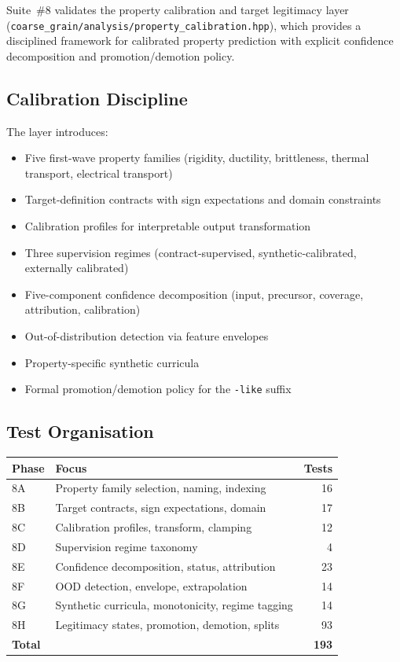 \documentclass[11pt]{article}
\newcommand{\file}[1]{\texttt{#1}}
\begin{document}
Suite~\#8 validates the property calibration and target legitimacy layer
(\file{coarse\_grain/analysis/property\_calibration.hpp}), which provides
a disciplined framework for calibrated property prediction with explicit
confidence decomposition and promotion/demotion policy.

\subsection{Calibration Discipline}

The layer introduces:
\begin{itemize}
    \item Five first-wave property families (rigidity, ductility,
          brittleness, thermal transport, electrical transport)
    \item Target-definition contracts with sign expectations and domain
          constraints
    \item Calibration profiles for interpretable output transformation
    \item Three supervision regimes (contract-supervised,
          synthetic-calibrated, externally calibrated)
    \item Five-component confidence decomposition (input, precursor,
          coverage, attribution, calibration)
    \item Out-of-distribution detection via feature envelopes
    \item Property-specific synthetic curricula
    \item Formal promotion/demotion policy for the \texttt{-like} suffix
\end{itemize}

\subsection{Test Organisation}

\begin{center}
\begin{tabular}{llr}
    \textbf{Phase} & \textbf{Focus} & \textbf{Tests} \\
    \midrule
    8A & Property family selection, naming, indexing & 16 \\
    8B & Target contracts, sign expectations, domain & 17 \\
    8C & Calibration profiles, transform, clamping & 12 \\
    8D & Supervision regime taxonomy & 4 \\
    8E & Confidence decomposition, status, attribution & 23 \\
    8F & OOD detection, envelope, extrapolation & 14 \\
    8G & Synthetic curricula, monotonicity, regime tagging & 14 \\
    8H & Legitimacy states, promotion, demotion, splits & 93 \\
    \midrule
    \textbf{Total} & & \textbf{193} \\
\end{tabular}
\end{center}
\end{document}
